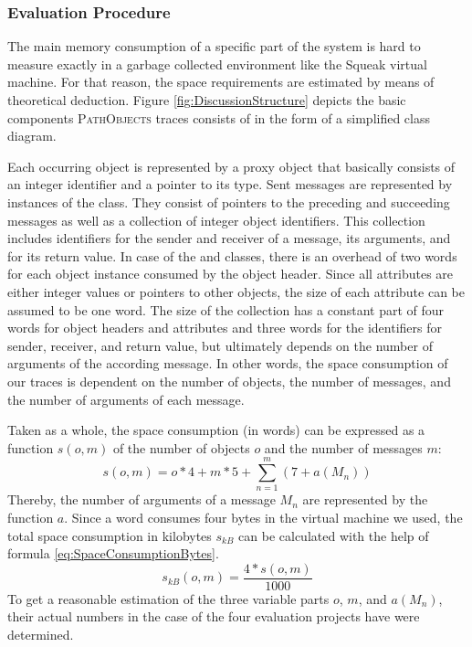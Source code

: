 \subsubsection{Evaluation Procedure}
The main memory consumption of a specific part of the system is hard to measure exactly in a garbage collected environment like the Squeak virtual machine.
For that reason, the space requirements are estimated by means of theoretical deduction.
Figure \ref{fig:DiscussionStructure} depicts the basic components \textsc{PathObjects} traces consists of in the form of a simplified class diagram.

Each occurring object is represented by a proxy object that basically consists of an integer identifier and a pointer to its type.
Sent messages are represented by instances of the  class.
They consist of pointers to the preceding and succeeding messages as well as a collection of integer object identifiers.
This collection includes identifiers for the sender and receiver of a message, its arguments, and for its return value.
In case of the  and  classes, there is an overhead of two words for each object instance consumed by the object header.
Since all attributes are either integer values or pointers to other objects, the size of each attribute can be assumed to be one word.
The size of the  collection has a constant part of four words for object headers and attributes and three words for the identifiers for sender, receiver, and return value, but ultimately depends on the number of arguments of the according message.
In other words, the space consumption of our traces is dependent on the number of objects, the number of messages, and the number of arguments of each message.

Taken as a whole, the space consumption (in words) can be expressed as a function $s(o,m)$ of the number of objects $o$ and the number of messages $m$:
\begin{equation}
s(o,m)=o*4 + m*5 + \sum_{n=1}^{m} (7 + a(M_n))\label{eq:SpaceConsumptionWords}
\end{equation}
Thereby, the number of arguments of a message $M_n$ are represented by the function $a$.
Since a word consumes four bytes in the virtual machine we used, the total space consumption in kilobytes $s_{kB}$ can be calculated with the help of formula \ref{eq:SpaceConsumptionBytes}. 
\begin{equation}
s_{kB}(o,m) = \frac{4 * s(o,m)}{1000}\label{eq:SpaceConsumptionBytes}
\end{equation}
To get a reasonable estimation of the three variable parts $o$, $m$, and $a(M_n)$, their actual numbers in the case of the four evaluation projects have were determined.

